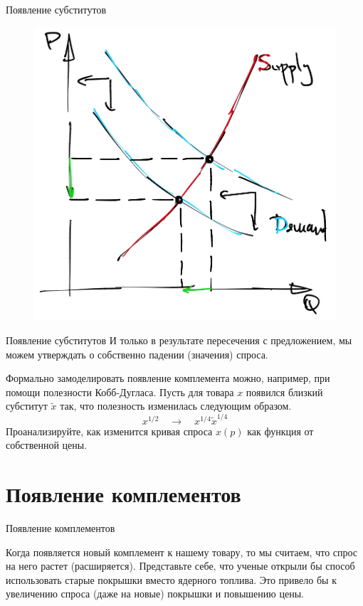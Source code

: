 \documentclass{beamer}
\begin{document}
\begin{frame}{Появление субститутов}
\begin{figure}[hbt]
\centering
\includegraphics[width=.7 \textwidth]{dem_contract.png}
\end{figure}
\end{frame}

\begin{frame}{Появление субститутов}
И только в результате пересечения с предложением, мы можем утверждать о собственно падении (значения) спроса.

Формально замоделировать появление комплемента можно, например, при помощи полезности Кобб-Дугласа. Пусть для товара $x$ появился близкий субститут $\tilde x$ так, что полезность изменилась следующим образом.
$$ x^{1/2} \quad \to \quad x^{1/4}\tilde x^{1/4}$$
Проанализируйте, как изменится кривая спроса $x(p)$ как функция от собственной цены.

\end{frame}

\section{Появление комплементов}

\begin{frame}{Появление комплементов}

Когда появляется новый комплемент к нашему товару, то мы считаем, что спрос на него растет (расширяется). Представьте себе, что ученые открыли бы способ использовать старые покрышки вместо ядерного топлива. Это привело бы к увеличению спроса (даже на новые) покрышки и повышению цены.

\end{frame}
\end{document}
